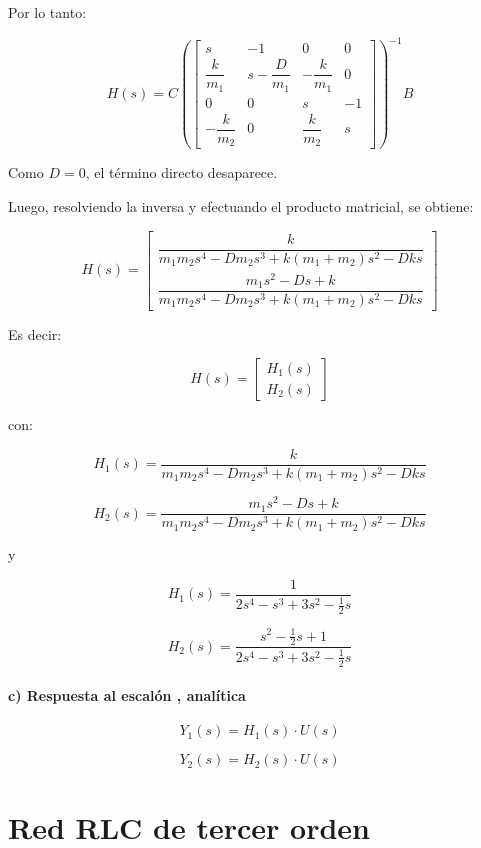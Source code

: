 \documentclass[a4paper]{article}
\begin{document}
Por lo tanto:

\[
H(s)=
C
\left(
\begin{bmatrix}
	s & -1 & 0 & 0\\
	\dfrac{k}{m_1} & s-\dfrac{D}{m_1} & -\dfrac{k}{m_1} & 0\\
	0 & 0 & s & -1\\
	-\dfrac{k}{m_2} & 0 & \dfrac{k}{m_2} & s
\end{bmatrix}
\right)^{-1}
B
\]

Como \(D=0\), el término directo desaparece.

Luego, resolviendo la inversa y efectuando el producto matricial, se obtiene:

\[
H(s)=
\begin{bmatrix}
	\dfrac{k}{
		m_1m_2 s^4
		-Dm_2 s^3
		+k(m_1+m_2)s^2
		-Dks
	}
	\\[12pt]
	\dfrac{m_1 s^2-Ds+k}{
		m_1m_2 s^4
		-Dm_2 s^3
		+k(m_1+m_2)s^2
		-Dks
	}
\end{bmatrix}
\]

Es decir:

\[
H(s)=
\begin{bmatrix}
	H_1(s)\\
	H_2(s)
\end{bmatrix}
\]

con:

\[
H_1(s)=
\dfrac{k}{
	m_1m_2 s^4
	-Dm_2 s^3
	+k(m_1+m_2)s^2
	-Dks
}
\]

\[
H_2(s)=
\dfrac{m_1 s^2-Ds+k}{
	m_1m_2 s^4
	-Dm_2 s^3
	+k(m_1+m_2)s^2
	-Dks
}
\]

 y
 
 
 \[
 H_1(s)=
 \dfrac{1}{
 	2 s^4
 	-  s^3
 	+3s^2
 	-\frac{1}{2} s
 }
 \]
 
 \[
 H_2(s)=
 \dfrac{s^2-\frac{1}{2} s + 1 } {
 	2 s^4
 	-  s^3
 	+ 3s^2
 	- \frac{1 }{2}s
 }
 \]
 
 
 \paragraph{c) Respuesta al escalón , analítica}
 
 
 \begin{equation}
 	Y_1(s) = H_1(s) \cdot U(s)
 \end{equation}

\begin{equation}
	Y_2(s) = H_2(s) \cdot U(s)
\end{equation}
 \section{Red RLC de tercer orden}
 
\end{document}
